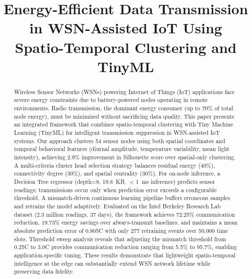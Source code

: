 \documentclass[conference]{IEEEtran}
\begin{document}
\title{Energy-Efficient Data Transmission in WSN-Assisted IoT Using Spatio-Temporal Clustering and TinyML}

\author{
\and
{}
}

\maketitle

\begin{abstract}
Wireless Sensor Networks (WSNs) powering Internet of Things (IoT) applications face severe energy constraints due to battery-powered nodes operating in remote environments. Radio transmission, the dominant energy consumer (up to 70\% of total node energy), must be minimized without sacrificing data quality. This paper presents an integrated framework that combines spatio-temporal clustering with Tiny Machine Learning (TinyML) for intelligent transmission suppression in WSN-assisted IoT systems. Our approach clusters 54 sensor nodes using both spatial coordinates and temporal behavioral features (diurnal amplitude, temperature variability, mean light intensity), achieving 2.9\% improvement in Silhouette score over spatial-only clustering. A multi-criteria cluster head selection strategy balances residual energy (40\%), connectivity degree (30\%), and spatial centrality (30\%). For on-node inference, a Decision Tree regressor (depth=8, 19.8~KB, $<$1~ms inference) predicts sensor readings; transmissions occur only when prediction error exceeds a configurable threshold. A mismatch-driven continuous learning pipeline buffers erroneous samples and retrains the model adaptively. Evaluated on the Intel Berkeley Research Lab dataset (2.3 million readings, 37 days), the framework achieves 72.25\% communication reduction, 19.73\% energy savings over always-transmit baselines, and maintains a mean absolute prediction error of 0.805\textdegree C with only 277 retraining events over 50,000 time slots. Threshold sweep analysis reveals that adjusting the mismatch threshold from 0.25\textdegree C to 3.0\textdegree C provides communication reduction ranging from 5.5\% to 95.7\%, enabling application-specific tuning. These results demonstrate that lightweight spatio-temporal intelligence at the edge can substantially extend WSN network lifetime while preserving data fidelity.
\end{abstract}
\end{document}
